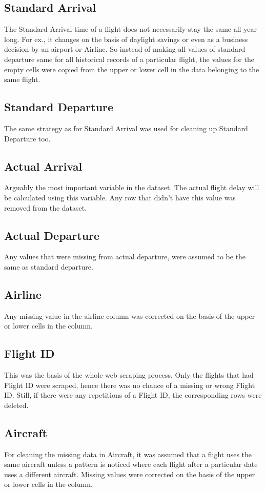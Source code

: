 \subsection{Standard Arrival}
The Standard Arrival time of a flight does not necessarily stay the same all year long. For ex., it changes on the basis of daylight savings or even as a business decision by an airport or Airline. So
instead of making all values of standard departure same for all historical records of a particular flight, the values for the empty cells were copied from the upper or lower cell in the data belonging to the same flight.

\subsection{Standard Departure}
The same strategy as for Standard Arrival was used for cleaning up Standard Departure too.

\subsection{Actual Arrival}
Arguably the most important variable in the dataset. The actual flight delay will be calculated using this variable. Any row that didn't have this value was removed from the dataset.

\subsection{Actual Departure}
Any values that were missing from actual departure, were assumed to be the same as standard departure.

\subsection{Airline}
Any missing value in the airline column was corrected on the basis of the upper or lower cells in the column. 

\subsection{Flight ID}
This was the basis of the whole web scraping process. Only the flights that had Flight ID were scraped, hence there was no chance of a missing or wrong Flight ID. Still, if there were any repetitions of a Flight ID, the corresponding rows were deleted.

\subsection{Aircraft}
For cleaning the missing data in Aircraft, it was assumed that a flight uses the same aircraft unless a pattern is noticed where each flight after a particular date uses a different aircraft. Missing values were corrected on the basis of the upper or lower cells in the column.

